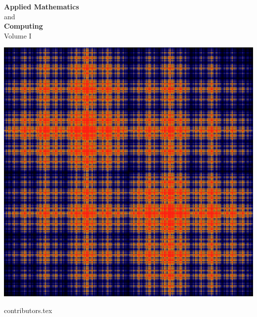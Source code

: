 \documentclass[nociteref]{newsiambook}
\begin{document}



\thispagestyle{empty}
\begin{center}
{\huge \bf Applied Mathematics} \\ and \\ {\huge \bf Computing} \\
\vspace{5mm}
{\Large Volume I}
\vspace{20mm}

\includegraphics[scale = .25]{Cover}
\end{center}
\frontmatter

{contributors.tex}

\end{document}
